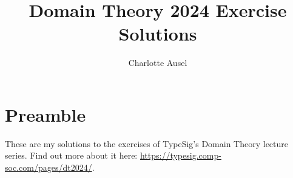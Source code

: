 \documentclass[a4paper]{book}
\title{Domain Theory 2024 Exercise Solutions}
\author{Charlotte Ausel}
\begin{document}
\maketitle

\tableofcontents

\setcounter{chapter}{-1}
\chapter{Preamble}
These are my solutions to the exercises of TypeSig's Domain Theory lecture series. Find out more about it here: \url{https://typesig.comp-soc.com/pages/dt2024/}.



\end{document}
